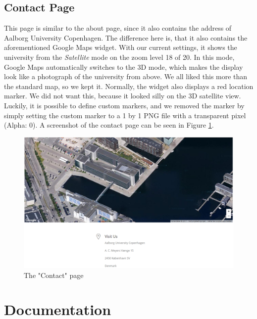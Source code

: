 \documentclass[12p]{article}
\begin{document}

\subsection{Contact Page} \label{ContactPage}

This page is similar to the about page, since it also contains the address of Aalborg University Copenhagen. The difference here is, that it also contains the aforementioned Google Maps widget. With our current settings, it shows the university from the \emph{Satellite} mode on the zoom level 18 of 20. In this mode, Google Maps automatically switches to the 3D mode, which makes the display look like a photograph of the university from above. We all liked this more than the standard map, so we kept it. Normally, the widget also displays a red location marker. We did not want this, because it looked silly on the 3D satellite view. Luckily, it is possible to define custom markers, and we removed the marker by simply setting the custom marker to a 1 by 1 PNG file with a transparent pixel (Alpha: 0). A screenshot of the contact page can be seen in Figure \ref{fig:contact_page}.

\begin{figure}[H]
    \centering
    \includegraphics[width=1\textwidth]{contact_page}
    \caption{The "Contact" page}
    \label{fig:contact_page}
\end{figure}


\newpage
\section{Documentation}
\end{document}
